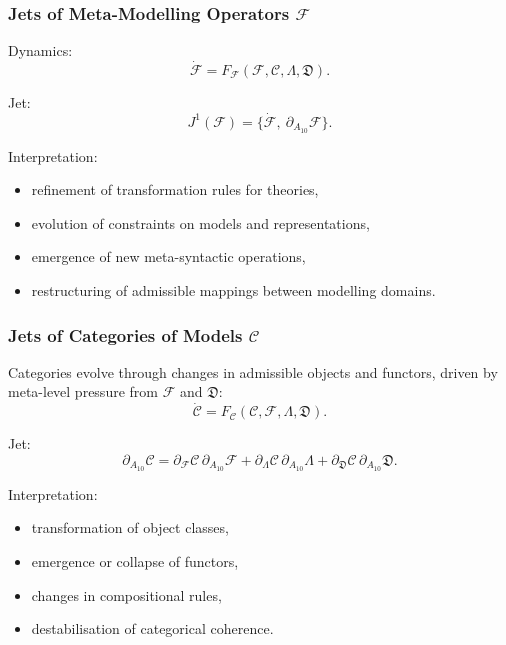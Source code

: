 \subsubsection{Jets of Meta-Modelling Operators $\mathcal{F}$}

Dynamics:
\[
\dot{\mathcal{F}}
=
F_{\mathcal{F}}(\mathcal{F},\mathcal{C},\Lambda,\mathfrak{D}).
\]

Jet:
\[
J^1(\mathcal{F})=
\{\dot{\mathcal{F}},\ \partial_{A_{10}}\mathcal{F}\}.
\]

Interpretation:
\begin{itemize}
    \item refinement of transformation rules for theories,
    \item evolution of constraints on models and representations,
    \item emergence of new meta-syntactic operations,
    \item restructuring of admissible mappings between modelling domains.
\end{itemize}


\subsubsection{Jets of Categories of Models $\mathcal{C}$}

Categories evolve through changes in admissible objects and functors,
driven by meta-level pressure from $\mathcal{F}$ and $\mathfrak{D}$:
\[
\dot{\mathcal{C}}
=
F_{\mathcal{C}}(\mathcal{C},\mathcal{F},\Lambda,\mathfrak{D}).
\]

Jet:
\[
\partial_{A_{10}}\mathcal{C}
=
\partial_{\mathcal{F}}\mathcal{C}\,\partial_{A_{10}}\mathcal{F}
+
\partial_{\Lambda}\mathcal{C}\,\partial_{A_{10}}\Lambda
+
\partial_{\mathfrak{D}}\mathcal{C}\,\partial_{A_{10}}\mathfrak{D}.
\]

Interpretation:
\begin{itemize}
    \item transformation of object classes,
    \item emergence or collapse of functors,
    \item changes in compositional rules,
    \item destabilisation of categorical coherence.
\end{itemize}


